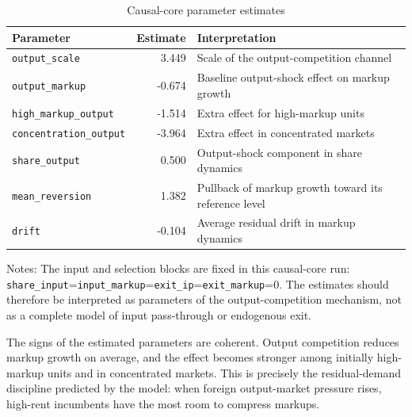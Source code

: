 \documentclass[11pt,a4paper]{article}
\begin{document}
\begin{table}[h!]
\centering
\caption{Causal-core parameter estimates}
\begin{threeparttable}
\small
\begin{tabular}{lrl}
\toprule
Parameter & Estimate & Interpretation \\
\midrule
\texttt{output\_scale} & 3.449 & Scale of the output-competition channel \\
\texttt{output\_markup} & -0.674 & Baseline output-shock effect on markup growth \\
\texttt{high\_markup\_output} & -1.514 & Extra effect for high-markup units \\
\texttt{concentration\_output} & -3.964 & Extra effect in concentrated markets \\
\texttt{share\_output} & 0.500 & Output-shock component in share dynamics \\
\texttt{mean\_reversion} & 1.382 & Pullback of markup growth toward its reference level \\
\texttt{drift} & -0.104 & Average residual drift in markup dynamics \\
\bottomrule
\end{tabular}
\begin{tablenotes}[flushleft]
\footnotesize
\item Notes: The input and selection blocks are fixed in this causal-core run: \texttt{share\_input}=\texttt{input\_markup}=\texttt{exit\_ip}=\texttt{exit\_markup}=0. The estimates should therefore be interpreted as parameters of the output-competition mechanism, not as a complete model of input pass-through or endogenous exit.
\end{tablenotes}
\end{threeparttable}
\end{table}

The signs of the estimated parameters are coherent. Output competition reduces markup growth on average, and the effect becomes stronger among initially high-markup units and in concentrated markets. This is precisely the residual-demand discipline predicted by the model: when foreign output-market pressure rises, high-rent incumbents have the most room to compress markups.
\end{document}
